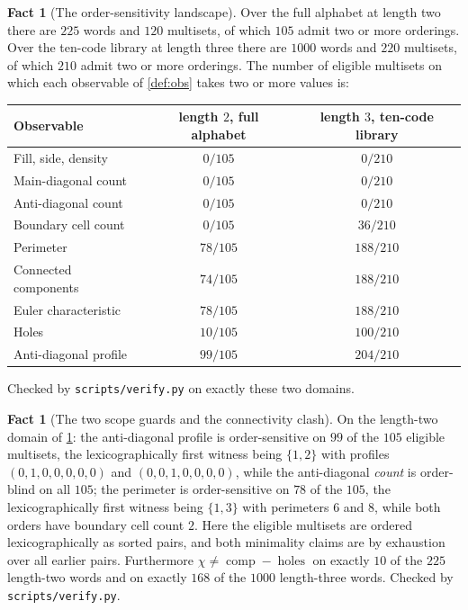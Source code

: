 \documentclass[11pt]{amsart}
\theoremstyle{definition}
\newtheorem{fact}[theorem]{Fact}
\theoremstyle{remark}
\begin{document}
\begin{fact}[The order-sensitivity landscape]
\label{fact:landscape}
Over the full alphabet at length two there are $225$ words and $120$ multisets, of which $105$ admit two or more orderings. Over the ten-code library at length three there are $1000$ words and $220$ multisets, of which $210$ admit two or more orderings. The number of eligible multisets on which each observable of \cref{def:obs} takes two or more values is:

\begin{center}
\small
\begin{tabular}{lcc}
\toprule
Observable & length $2$, full alphabet & length $3$, ten-code library \\
\midrule
Fill, side, density & $0 / 105$ & $0 / 210$ \\
Main-diagonal count & $0 / 105$ & $0 / 210$ \\
Anti-diagonal count & $0 / 105$ & $0 / 210$ \\
Boundary cell count & $0 / 105$ & $36 / 210$ \\
Perimeter & $78 / 105$ & $188 / 210$ \\
Connected components & $74 / 105$ & $188 / 210$ \\
Euler characteristic & $78 / 105$ & $188 / 210$ \\
Holes & $10 / 105$ & $100 / 210$ \\
Anti-diagonal profile & $99 / 105$ & $204 / 210$ \\
\bottomrule
\end{tabular}
\end{center}

Checked by \texttt{scripts/verify.py} on exactly these two domains.
\end{fact}

\begin{fact}[The two scope guards and the connectivity clash]
\label{fact:guards}
On the length-two domain of \cref{fact:landscape}: the anti-diagonal profile is order-sensitive on $99$ of the $105$ eligible multisets, the lexicographically first witness being $\{1,2\}$ with profiles $(0,1,0,0,0,0,0)$ and $(0,0,1,0,0,0,0)$, while the anti-diagonal \emph{count} is order-blind on all $105$; the perimeter is order-sensitive on $78$ of the $105$, the lexicographically first witness being $\{1,3\}$ with perimeters $6$ and $8$, while both orders have boundary cell count $2$. Here the eligible multisets are ordered lexicographically as sorted pairs, and both minimality claims are by exhaustion over all earlier pairs. Furthermore $\chi \neq \operatorname{comp} - \operatorname{holes}$ on exactly $10$ of the $225$ length-two words and on exactly $168$ of the $1000$ length-three words. Checked by \texttt{scripts/verify.py}.
\end{fact}
\end{document}
